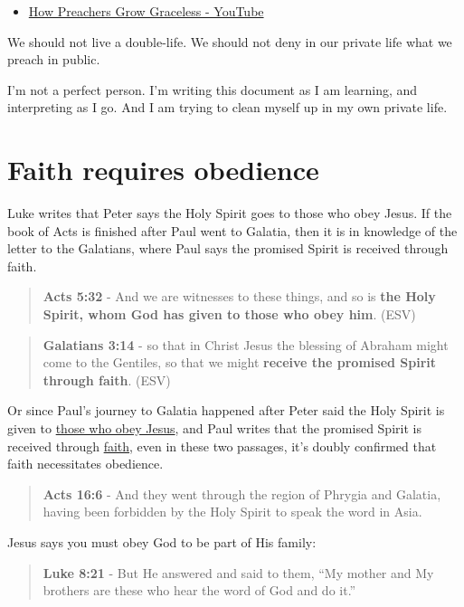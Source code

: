 \documentclass[11pt]{article}
\begin{document}
\begin{itemize}
\item \href{https://www.youtube.com/watch?v=alOI2zxIPgc}{How Preachers Grow Graceless - YouTube}
\end{itemize}

We should not live a double-life.
We should not deny in our private life what we preach in public.

I'm not a perfect person. I'm writing this document as I am learning, and interpreting as I go.
And I am trying to clean myself up in my own private life.

\section{Faith requires obedience}
\label{sec:orgae79df4}
Luke writes that Peter says the Holy Spirit goes to those who obey Jesus.
If the book of Acts is finished after Paul went to Galatia, then it is in knowledge of the letter to the Galatians, where Paul says the promised Spirit is received through faith.

\begin{quote}
\textbf{Acts 5:32} - And we are witnesses to these things, and so is \textbf{the Holy Spirit, whom God has given to those who obey him}. (ESV)
\end{quote}

\begin{quote}
\textbf{Galatians 3:14} - so that in Christ Jesus the blessing of Abraham might come to the Gentiles, so that we might \textbf{receive the promised Spirit through faith}. (ESV)
\end{quote}

Or since Paul's journey to Galatia happened after Peter said the Holy Spirit is given to \uline{those who obey Jesus}, and Paul writes that the promised Spirit is received through \uline{faith}, even in these two passages, it's doubly confirmed that faith necessitates obedience.

\begin{quote}
\textbf{Acts 16:6} - And they went through the region of Phrygia and Galatia, having been forbidden by the Holy Spirit to speak the word in Asia.
\end{quote}

Jesus says you must obey God to be part of His family:

\begin{quote}
\textbf{Luke 8:21} - But He answered and said to them, “My mother and My brothers are these who hear the word of God and do it.”
\end{quote}
\end{document}
